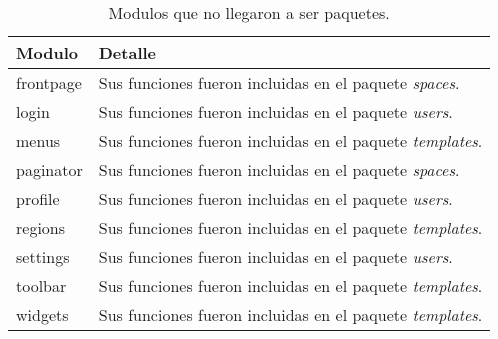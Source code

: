 \begin{table}
\begin{tabular}{l|l}
Modulo & Detalle \\
\hline
frontpage & Sus funciones fueron incluidas en el paquete \emph{spaces}. \\
login & Sus funciones fueron incluidas en el paquete \emph{users}. \\
menus & Sus funciones fueron incluidas en el paquete \emph{templates}. \\
paginator & Sus funciones fueron incluidas en el paquete \emph{spaces}. \\
profile & Sus funciones fueron incluidas en el paquete \emph{users}. \\
regions & Sus funciones fueron incluidas en el paquete \emph{templates}. \\
settings & Sus funciones fueron incluidas en el paquete \emph{users}. \\
toolbar & Sus funciones fueron incluidas en el paquete \emph{templates}. \\
widgets & Sus funciones fueron incluidas en el paquete \emph{templates}. \\
\end{tabular}
\caption{Modulos que no llegaron a ser paquetes.}
\label{modulos_eliminados}
\end{table}
